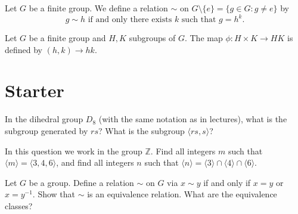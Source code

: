 \documentclass[answers]{exam}
\begin{document}
\begin{questions}
\question%
Let $G$ be a finite group. We define a relation $\sim$ on $G \setminus\{e\}=\{g \in G: g \neq e\}$ by \[
	g \sim h \text { if and only there exists } k \text { such that } g=h^{k}.
\]



\question%
Let $G$ be a finite group and $H, K$ subgroups of $G$. The map $\phi: H \times K \to H K$ is defined by $(h, k) \to h k$.

\end{questions}



\section*{Starter}
\begin{questions}

\question%
In the dihedral group $D_{8}$ (with the same notation as in lectures), what is the subgroup generated by $r s$? What is the subgroup $\langle r s, s\rangle$?



\question%
In this question we work in the group $\mathbb{Z}$. Find all integers $m$ such that $\langle m\rangle=\langle 3,4,6\rangle$, and find all integers $n$ such that $\langle n\rangle=\langle 3\rangle \cap\langle 4\rangle \cap\langle 6\rangle$.



\question%
Let $G$ be a group. Define a relation $\sim$ on $G$ via $x \sim y$ if and only if $x=y$ or $x=y^{-1}$. Show that $\sim$ is an equivalence relation. What are the equivalence classes?

\end{questions}
\end{document}
